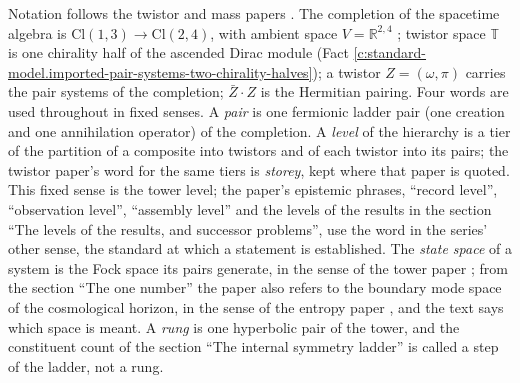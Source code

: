 \documentclass[11pt]{article}
\theoremstyle{definition}
\theoremstyle{plain}
\providecommand{\Cl}{}\renewcommand{\Cl}{\mathrm{Cl}}
\providecommand{\R}{}\renewcommand{\R}{\mathbb{R}}
\providecommand{\T}{}\renewcommand{\T}{\mathbb{T}}
\begin{document}
\label{c:note.standard-model.setting-setting-imports}
Notation follows the twistor and mass papers \cite{ButlerT9, ButlerT11}. The completion of the spacetime algebra is $\Cl(1,3) \to \Cl(2,4)$, with ambient space $V = \R^{2,4}$ \cite[\S 2]{ButlerT9}; twistor space $\T$ is one chirality half of the ascended Dirac module (Fact \ref{c:standard-model.imported-pair-systems-two-chirality-halves}); a twistor $Z = (\omega, \pi)$ carries the pair systems of the completion; $\bar{Z} \cdot Z$ is the Hermitian pairing. Four words are used throughout in fixed senses. A \emph{pair} is one fermionic ladder pair (one creation and one annihilation operator) of the completion. A \emph{level} of the hierarchy is a tier of the partition of a composite into twistors and of each twistor into its pairs; the twistor paper's word for the same tiers is \emph{storey}, kept where that paper is quoted. This fixed sense is the tower level; the paper's epistemic phrases, ``record level'', ``observation level'', ``assembly level'' and the levels of the results in the section ``The levels of the results, and successor problems'', use the word in the series' other sense, the standard at which a statement is established. The \emph{state space} of a system is the Fock space its pairs generate, in the sense of the tower paper \cite{ButlerT3}; from the section ``The one number'' the paper also refers to the boundary mode space of the cosmological horizon, in the sense of the entropy paper \cite{ButlerT8}, and the text says which space is meant. A \emph{rung} is one hyperbolic pair of the tower, and the constituent count of the section ``The internal symmetry ladder'' is called a step of the ladder, not a rung.
\end{document}
